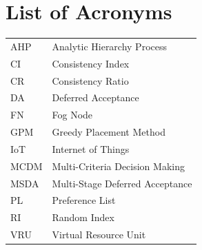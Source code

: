 \chapter*{List of Acronyms}



\begin{longtable}{ll}


AHP             & Analytic Hierarchy Process \\


CI              & Consistency Index \\
CR              & Consistency Ratio \\


DA              & Deferred Acceptance \\


FN              & Fog Node \\


GPM             & Greedy Placement Method \\


IoT             & Internet of Things \\


MCDM            & Multi-Criteria Decision Making \\
MSDA            & Multi-Stage Deferred Acceptance \\


PL              & Preference List \\


RI              & Random Index \\


VRU             & Virtual Resource Unit \\

\end{longtable}
